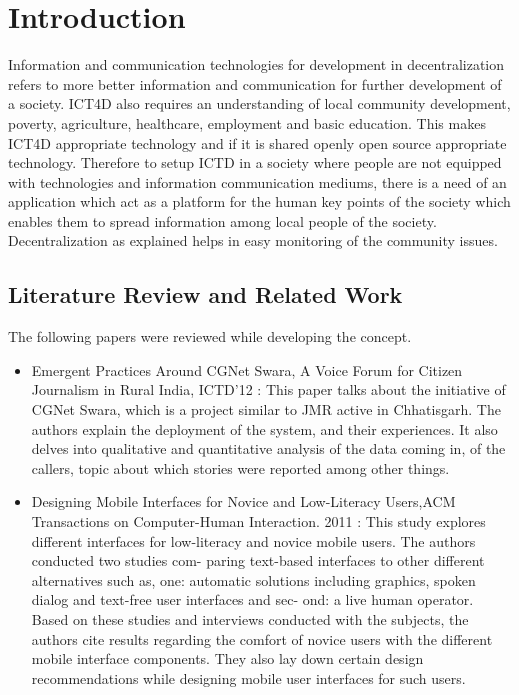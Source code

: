 \chapter{Introduction}

Information and communication technologies for development in decentralization refers to more better information and communication for further development of a society. ICT4D also requires
an understanding of local community development, poverty, agriculture, healthcare,
employment and basic education. This makes ICT4D appropriate technology and if it is
shared openly open source appropriate technology.
Therefore to setup ICTD in a society where people are not equipped with technologies and information communication mediums, there is a need of an application which act as a
platform for the human key points of the society which enables them to spread
information among local people of the society. Decentralization as explained \cite{ict1} helps in easy monitoring of the community issues.

\section{Literature Review and Related Work}
The following papers were reviewed while developing the concept.
\begin{itemize}
\item Emergent Practices Around CGNet Swara, A Voice Forum for Citizen Journalism
in Rural India, ICTD’12 \cite{cgnet} : This paper talks about the initiative of CGNet Swara,
which is a project similar to JMR active in Chhatisgarh. The authors explain the
deployment of the system, and their experiences. It also delves into qualitative
and quantitative analysis of the data coming in, of the callers, topic about which
stories were reported among other things.

\item Designing Mobile Interfaces for Novice and Low-Literacy Users,ACM Transactions
on Computer-Human Interaction. 2011 \cite{design}: This study explores different interfaces
for low-literacy and novice mobile users. The authors conducted two studies com-
paring text-based interfaces to other different alternatives such as, one: automatic
solutions including graphics, spoken dialog and text-free user interfaces and sec-
ond: a live human operator. Based on these studies and interviews conducted
with the subjects, the authors cite results regarding the comfort of novice users
with the different mobile interface components. They also lay down certain design
recommendations while designing mobile user interfaces for such users.

\end{itemize}

